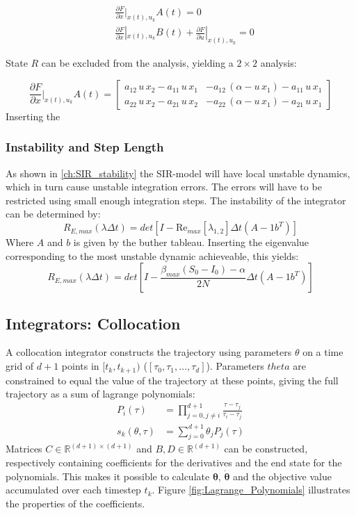 \begin{align}
        &\frac{\partial F}{\partial x}|_{x(t),u_k} A(t) = 0\\
 &\frac{\partial F}{\partial x}|_{x(t), u_k} B(t) + \frac{\partial F}{\partial u}|_{x(t), u_k} = 0
\end{align}

State $R$ can be excluded from the analysis, yielding a $2\times 2$ analysis:

\begin{equation}
\frac{\partial F}{\partial x}|_{x(t),u_k} A(t) = 
\begin{bmatrix}
    a_{12}\,u\,x_{2}-a_{11}\,u\,x_{1} & -a_{12}\,\left(\alpha-u\,x_{1}\right)-a_{11}\,u\,x_{1}\\ a_{22}\,u\,x_{2}-a_{21}\,u\,x_{2} & -a_{22}\,\left(\alpha-u\,x_{1}\right)-a_{21}\,u\,x_{1} 
    \end{bmatrix}
\end{equation}
Inserting the 


\subsubsection{Instability and Step Length}
As shown in \ref{ch:SIR_stability} the SIR-model will have local unstable dynamics, which in turn cause unstable integration errors. The errors will have to be restricted using small enough integration steps. The instability of the integrator can be determined by:
\begin{equation}
    R_{E, max}(\lambda \Delta t) = det[I-\text{Re}_{max}[\lambda_{1,2}] \Delta t(A - 1b^T)]
\end{equation}
Where $A$ and $b$ is given by the buther tableau. Inserting the eigenvalue corresponding to the most unstable dynamic achieveable, this yields:
\begin{equation}
    R_{E, max}(\lambda \Delta t) = det[I- \frac{\beta_{max}(S_0-I_0) - \alpha}{2N} \Delta t(A - 1b^T)]
\end{equation}
\subsection{Integrators: Collocation}
A collocation integrator constructs the trajectory using
parameters $\theta$ on a time grid of $d+1$ points in $[t_k, t_{k+1})$ ($[\tau_0, \tau_1, \dots, \tau_d]$). Parameters $theta$ are constrained to equal the value of the trajectory at these points, giving the full trajectory as a sum of lagrange polynomials:
\begin{align}
    P_i(\tau) &= \prod_{j=0, j \neq i}^{d+1} \frac{\tau-\tau_j}{\tau_i - \tau_j}\\
    s_k(\theta, \tau) &= \sum_{j=0}^{d+1} \theta_j P_j(\tau)
\end{align}
Matrices $C \in \mathbb{R}^{(d+1)\times(d+1)}$ and $B, D \in \mathbb{R}^{(d+1)}$ can be constructed, respectively containing coefficients for the derivatives and the end state for the polynomials. This makes it possible to calculate $\bm{\theta}$, $\bm{\dot{\theta}}$ and the objective value accumulated over each timestep $t_k$. Figure \ref{fig:Lagrange_Polynomials} illustrates the properties of the coefficients.

